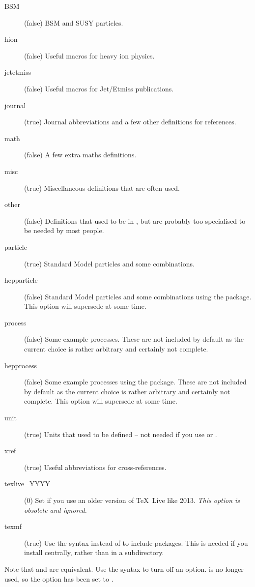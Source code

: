 \begin{description}
\item[BSM](false) BSM and SUSY particles.
\item[hion](false) Useful macros for heavy ion physics.
\item[jetetmiss](false) Useful macros for Jet/Etmiss publications.
\item[journal](true) Journal abbreviations and a few other definitions for references.
\item[math](false) A few extra maths definitions.
\item[misc](true) Miscellaneous definitions that are often used.
\item[other](false) Definitions that used to be in ,
  but are probably too specialised to be needed by most people.
\item[particle](true) Standard Model particles and some combinations.
\item[hepparticle](false) Standard Model particles and some combinations using the  package.
  This option will supersede  at some time.
\item[process](false) Some example processes.
  These are not included by default as the current choice is rather arbitrary
  and certainly not complete.
\item[hepprocess](false) Some example processes using the  package.
  These are not included by default as the current choice is rather arbitrary
  and certainly not complete.
  This option will supersede  at some time.
\item[unit](true) Units that used to be defined -- not needed if you use  or .
\item[xref](true) Useful abbreviations for cross-references.
\item[texlive=YYYY](0) Set if you use an older version of \TeX\ Live like 2013.
  \emph{ This option is obsolete and ignored.}
\item[texmf](true) Use the syntax 
  instead of  to include packages.
  This is needed if you install  centrally,
  rather than in a  subdirectory.
\end{description}
Note that  and  are equivalent.
Use the syntax  to turn off an option.
  is no longer used,
so the option  has been set to .

